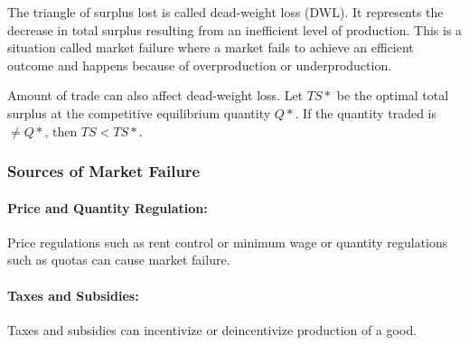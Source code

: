 \documentclass{article}
\begin{document}
The triangle of surplus lost is called dead-weight loss (DWL). It represents
the decrease in total surplus resulting from an inefficient level of production.
This is a situation called market failure where a market fails to achieve an
efficient outcome and happens because of overproduction or underproduction. \par
Amount of trade can also affect dead-weight loss. Let \( TS* \) be the optimal
total surplus at the competitive equilibrium quantity \( Q* \). If the quantity
traded is \( \neq Q* \), then \( TS < TS* \).
\begin{center}
\end{center}

\subsubsection{Sources of Market Failure}

\paragraph{Price and Quantity Regulation:}
Price regulations such as rent control or minimum wage or quantity regulations
such as quotas can cause market failure.

\paragraph{Taxes and Subsidies:}
Taxes and subsidies can incentivize or deincentivize production of a good.
\end{document}
